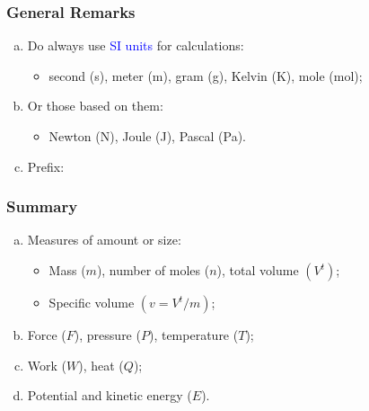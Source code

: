 \documentclass[10pt,compress,handout,ignorenonframetext]{beamer}
\begin{document}
\begin{frame}
 \frametitle{General Remarks}
  \begin{enumerate}[(a)]
   \item <1-> Do always use \textcolor{blue}{SI units} for calculations:
     \begin{itemize}
       \item<1-> second (s), meter (m), gram (g), Kelvin (K), mole (mol);
     \end{itemize}
   \item<2-> Or those based on them:
     \begin{itemize}
       \item<4-> Newton (N), Joule (J), Pascal (Pa).
     \end{itemize}
   \item<3-> Prefix: 
  \end{enumerate}
\end{frame}


\begin{frame}
 \frametitle{Summary}
  \begin{enumerate}[(a)]
   \item <1-> Measures of amount or size:
     \begin{itemize}
       \item<1-> Mass ($m$), number of moles ($n$), total volume $\left(V^{t}\right)$;
       \item<1-> Specific volume $\left(v=V^{t}/m\right)$;
     \end{itemize}
   \item<1-> Force ($F$), pressure ($P$), temperature ($T$);
   \item<1-> Work ($W$), heat ($Q$);
   \item<1-> Potential and kinetic energy ($E$).
  \end{enumerate} 
\end{frame}
\end{document}
